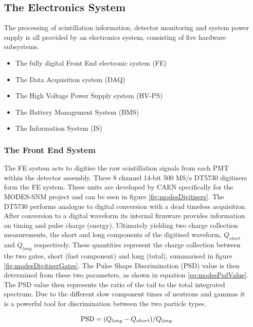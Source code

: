 \subsection{The Electronics System}
The processing of scintillation information, detector monitoring and system power supply is all provided by an electronics system, consisting of five hardware subsystems.

\begin{itemize}
	\item The fully digital Front End electronic system (FE)
	\item The Data Acquisition system (DAQ)
	\item The High Voltage Power Supply system (HV-PS)
	\item The Battery Management System (BMS)
	\item The Information System (IS)
\end{itemize}

\subsubsection{The Front End System}
The FE system acts to digitise the raw scintillation signals from each PMT within the detector assembly. Three 8 channel 14-bit 500 MS/s DT5730 digitisers form the FE system. These units are developed by CAEN specifically for the MODES-SNM project and can be seen in figure \ref{fig:modesDigitisers}. The DT5730 performs analogue to digital conversion with a dead timeless acquisition. After conversion to a digital waveform its internal firmware provides information on timing and pulse charge (energy). Ultimately yielding two charge collection measurements, the short and long components of the digitised waveform, $Q_{short}$ and $Q_{long}$ respectively. These quantities represent the charge collection between the two gates, short (fast component) and long (total), summarised in figure \ref{fig:modesDigitiserGates}. The Pulse Shape Discrimination (PSD) value is then determined from these two parameters, as shown in equation \ref{eq:modesPsdValue}. The PSD value then represents the ratio of the tail to the total integrated spectrum. Due to the different slow component times of neutrons and gammas it is a powerful tool for discrimination between the two particle types. 

\begin{equation}
	\textnormal{PSD} = (Q_{long} - Q_{short}) / Q_{long} 
	\label{eq:modesPsdValue}
\end{equation}

